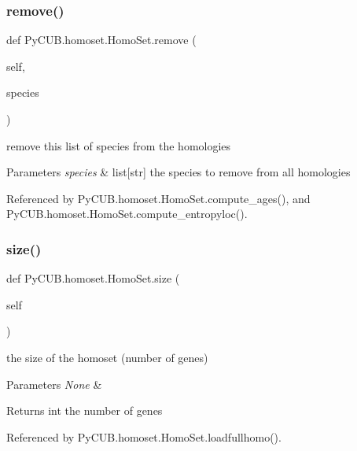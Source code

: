 \subsubsection{\texorpdfstring{remove()}{remove()}}
{\footnotesize\ttfamily def Py\+C\+U\+B.\+homoset.\+Homo\+Set.\+remove (\begin{DoxyParamCaption}\item[{}]{self,  }\item[{}]{species }\end{DoxyParamCaption})}



remove this list of species from the homologies 


\begin{DoxyParams}{Parameters}
{\em species} & list\mbox{[}str\mbox{]} the species to remove from all homologies \\
\hline
\end{DoxyParams}


Referenced by Py\+C\+U\+B.\+homoset.\+Homo\+Set.\+compute\+\_\+ages(), and Py\+C\+U\+B.\+homoset.\+Homo\+Set.\+compute\+\_\+entropyloc().

\mbox{\label{class_py_c_u_b_1_1homoset_1_1_homo_set_a000511647e3f85d8abadcdddaddfb04d}} 
\subsubsection{\texorpdfstring{size()}{size()}}
{\footnotesize\ttfamily def Py\+C\+U\+B.\+homoset.\+Homo\+Set.\+size (\begin{DoxyParamCaption}\item[{}]{self }\end{DoxyParamCaption})}



the size of the homoset (number of genes) 


\begin{DoxyParams}{Parameters}
{\em None} & \\
\hline
\end{DoxyParams}
\begin{DoxyReturn}{Returns}
int the number of genes 
\end{DoxyReturn}


Referenced by Py\+C\+U\+B.\+homoset.\+Homo\+Set.\+loadfullhomo().

